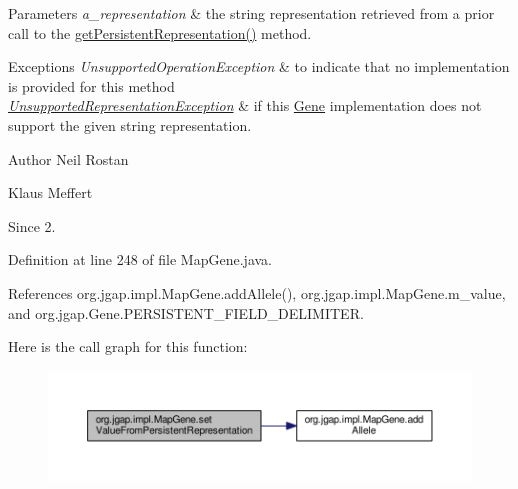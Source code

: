 \begin{DoxyParams}{Parameters}
{\em a\-\_\-representation} & the string representation retrieved from a prior call to the \hyperlink{classorg_1_1jgap_1_1impl_1_1_map_gene_a0a1b56bd574314d61311ac070f7f9845}{get\-Persistent\-Representation()} method.\\
\hline
\end{DoxyParams}

\begin{DoxyExceptions}{Exceptions}
{\em Unsupported\-Operation\-Exception} & to indicate that no implementation is provided for this method \\
\hline
{\em \hyperlink{classorg_1_1jgap_1_1_unsupported_representation_exception}{Unsupported\-Representation\-Exception}} & if this \hyperlink{interfaceorg_1_1jgap_1_1_gene}{Gene} implementation does not support the given string representation.\\
\hline
\end{DoxyExceptions}
\begin{DoxyAuthor}{Author}
Neil Rostan 

Klaus Meffert 
\end{DoxyAuthor}
\begin{DoxySince}{Since}
2. 
\end{DoxySince}


Definition at line 248 of file Map\-Gene.\-java.



References org.\-jgap.\-impl.\-Map\-Gene.\-add\-Allele(), org.\-jgap.\-impl.\-Map\-Gene.\-m\-\_\-value, and org.\-jgap.\-Gene.\-P\-E\-R\-S\-I\-S\-T\-E\-N\-T\-\_\-\-F\-I\-E\-L\-D\-\_\-\-D\-E\-L\-I\-M\-I\-T\-E\-R.



Here is the call graph for this function\-:
\nopagebreak
\begin{figure}[H]
\begin{center}
\leavevmode
\includegraphics[width=350pt]{classorg_1_1jgap_1_1impl_1_1_map_gene_aa26832d5aefa69e44d2efd58e333e230_cgraph}
\end{center}
\end{figure}


